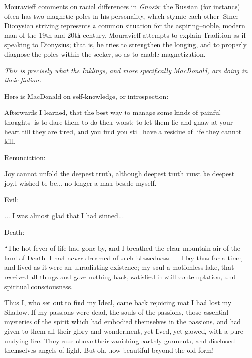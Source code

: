 Mouravieff comments on racial differences in \emph{Gnosis}: the Russian (for instance) often has two magnetic poles in his personality, which stymie each other. Since Dionysian striving represents a common situation for the aspiring--noble, modern man of the 19th and 20th century, Mouravieff attempts to explain Tradition as if speaking to Dionysius; that is, he tries to strengthen the longing, and to properly diagnose the poles within the seeker, so as to enable magnetization.

\emph{This is precisely what the Inklings, and more specifically MacDonald, are doing in their fiction.}

Here is MacDonald on self-knowledge, or introspection:

\begin{quotex}
Afterwards I learned, that the best way to manage some kinds of painful thoughts, is to dare them to do their worst; to let them lie and gnaw at your heart till they are tired, and you find you still have a residue of life they cannot kill.
\end{quotex}


Renunciation:

\begin{quotex}
Joy cannot unfold the deepest truth, although deepest truth must be deepest joy.I wished to be... no longer a man beside myself.
\end{quotex}


Evil:

\begin{quotex}
... I was almost glad that I had sinned...
\end{quotex}


Death:

\begin{quotex}
``The hot fever of life had gone by, and I breathed the clear mountain-air of the land of Death. I had never dreamed of such blessedness. ... I lay thus for a time, and lived as it were an unradiating existence; my soul a motionless lake, that received all things and gave nothing back; satisfied in still contemplation, and spiritual consciousness. 

Thus I, who set out to find my Ideal, came back rejoicing mat I had lost my Shadow. If my passions were dead, the souls of the passions, those essential mysteries of the spirit which had embodied themselves in the passions, and had given to them all their glory and wonderment, yet lived, yet glowed, with a pure undying fire. They rose above their vanishing earthly garments, and disclosed themselves angels of light. But oh, how beautiful beyond the old form! 
\end{quotex}


